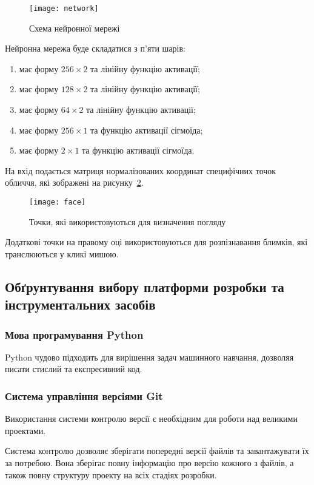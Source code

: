 \begin{figure}[H]
	\centering
	\texttt{[image: network]}
	\caption{Схема нейронної мережі}
	\label{fig:network}
\end{figure} 

Нейронна мережа буде складатися з п'яти шарів:
\begin{enumerate}[label={\arabic*-й ---}]
	\item має форму $256\times2$ та лінійну функцію активації; 
	\item має форму $128\times2$ та лінійну функцію активації; 
	\item має форму $64\times2$ та лінійну функцію активації; 
	\item має форму $256\times1$ та функцію активації сігмоїда; 
	\item має форму $2\times1$ та функцію активації сігмоїда. 
\end{enumerate}

На вхід подається матриця нормалізованих координат специфічних точок обличчя, які зображені на рисунку~\ref{fig:face}. 

\begin{figure}[H]
	\centering
	\texttt{[image: face]}
	\caption{Точки, які використовуються для визначення погляду}
	\label{fig:face}
\end{figure} 

Додаткові точки на правому оці використовуються для розпізнавання блимків, які транслюються у кликі мишою.

\subsection{Обґрунтування вибору платформи розробки та інструментальних засобів}
\subsubsection{Мова програмування Python}
Python чудово підходить для вирішення задач машинного навчання, дозволяя писати стислий та експресивний код.

\subsubsection{Система управління версіями Git}
Використання системи контролю версії є необхідним для роботи над великими проектами.

Система контролю дозволяє зберігати попередні версії файлів та завантажувати їх за потребою. 
Вона зберігає повну інформацію про версію кожного з файлів, а також повну структуру проекту на всіх стадіях розробки.

